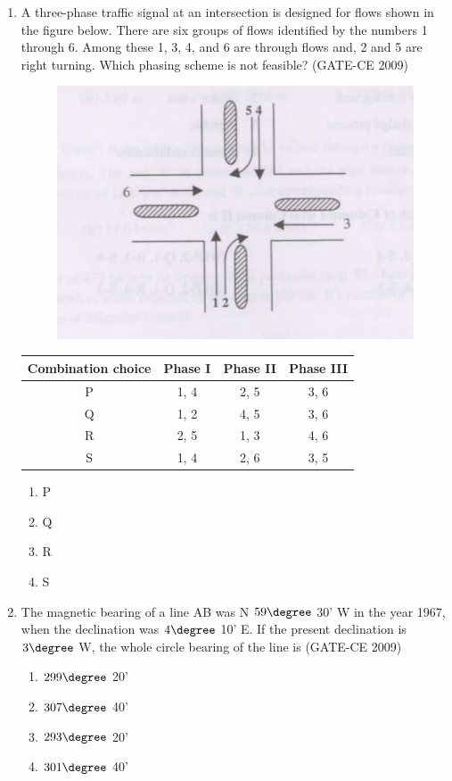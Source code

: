 \documentclass[journal,12pt,onecolumn]{article}
\theoremstyle{remark}
\begin{document}
\begin{enumerate}
    \item A three-phase traffic signal at an intersection is designed for flows shown in the figure below. There are six groups of flows identified by the numbers 1 through 6. Among these 1, 3, 4, and 6 are through flows and, 2 and 5 are right turning. Which phasing scheme is not feasible? (GATE-CE 2009)
    \begin{figure}[H]
    \centering
    \includegraphics[width=0.7\columnwidth]{figs/image4.jpg}
    \caption{}
    \label{fig:placeholder}
    \end{figure}
    \begin{tabular}{|c|c|c|c|}
    \hline
    Combination choice & Phase I & Phase II & Phase III \\
    \hline
    P & 1, 4 & 2, 5 & 3, 6 \\
    Q & 1, 2 & 4, 5 & 3, 6 \\
    R & 2, 5 & 1, 3 & 4, 6 \\
    S & 1, 4 & 2, 6 & 3, 5 \\
    \hline
    \end{tabular}
    \begin{multicols}{4}
    \begin{enumerate}
        \item P 
        \item Q 
        \item R 
        \item S
    \end{enumerate}
\end{multicols}
    
    \item The magnetic bearing of a line AB was N $59\degree$ 30' W in the year 1967, when the declination was $4\degree$ 10' E. If the present declination is $3\degree$ W, the whole circle bearing of the line is (GATE-CE 2009)
    \begin{multicols}{2}
    \begin{enumerate}
        \item $299\degree$ 20' 
        \item $307\degree$ 40' 
        \item $293\degree$ 20' 
        \item $301\degree$ 40'
    \end{enumerate}
\end{multicols}
    

\end{enumerate}
\end{document}
